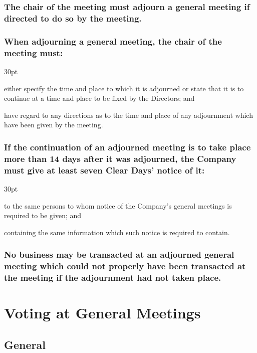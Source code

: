 \documentclass[12pt]{article}
\def\clauseindent{30pt}
\newenvironment{subindentpara}{\begin{adjustwidth}{\clauseindent}{}\begin{hanginglist}}{\end{hanginglist}\end{adjustwidth}}
\begin{document}
\subsubsection[Adjournment may be directed at a general meeting]{The chair of the meeting must adjourn a general meeting if directed to do so by the meeting.}
\subsubsection[Specifics of adjournment of a general meeting]{When adjourning a general meeting, the chair of the meeting must:}
\begin{subindentpara}
    \item either specify the time and place to which it is adjourned or state that it is to continue at a time and place to be fixed by the Directors; and
    \item have regard to any directions as to the time and place of any adjournment which have been given by the meeting.
\end{subindentpara}
\subsubsection[Notice and adjournment]{If the continuation of an adjourned meeting is to take place more than 14 days after it was adjourned, the Company must give at least seven Clear Days' notice of it:}
\begin{subindentpara}
    \item to the same persons to whom notice of the Company's general meetings is required to be given; and
    \item containing the same information which such notice is required to contain.
\end{subindentpara}
\subsubsection[Adjourned meetings work like non-adjourned meetings]{No business may be transacted at an adjourned general meeting which could not properly have been transacted at the meeting if the adjournment had not taken place.}

\section*{Voting at General Meetings}

\subsection{General}
\end{document}
